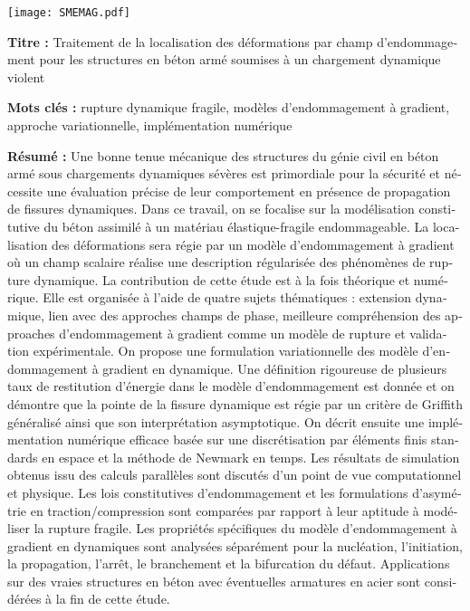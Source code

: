 \pagestyle{empty}

\begin{flushleft}
\texttt{[image: SMEMAG.pdf]}

\vspace{20pt}

\begin{mdframed}
\begin{otherlanguage}{french}
\textbf{Titre :} Traitement de la localisation des déformations par champ d'endommagement pour les structures en béton armé soumises à un chargement dynamique violent

\textbf{Mots clés :} rupture dynamique fragile, modèles d'endommagement à gradient, approche variationnelle, implémentation numérique

\textbf{Résumé :} Une bonne tenue mécanique des structures du génie civil en béton armé sous chargements dynamiques sévères est primordiale pour la sécurité et nécessite une évaluation précise de leur comportement en présence de propagation de fissures dynamiques. Dans ce travail, on se focalise sur la modélisation constitutive du béton assimilé à un matériau élastique-fragile endommageable. La localisation des déformations sera régie par un modèle d'endommagement à gradient où un champ scalaire réalise une description régularisée des phénomènes de rupture dynamique. La contribution de cette étude est à la fois théorique et numérique. Elle est organisée à l'aide de quatre sujets thématiques : extension dynamique, lien avec des approches champs de phase, meilleure compréhension des approaches d'endommagement à gradient comme un modèle de rupture et validation expérimentale. On propose une formulation variationnelle des modèle d'endommagement à gradient en dynamique. Une définition rigoureuse de plusieurs taux de restitution d'énergie dans le modèle d'endommagement est donnée et on démontre que la pointe de la fissure dynamique est régie par un critère de Griffith généralisé ainsi que son interprétation asymptotique. On décrit ensuite une implémentation numérique efficace basée sur une discrétisation par éléments finis standards en espace et la méthode de Newmark en temps. Les résultats de simulation obtenus issu des calculs parallèles sont discutés d'un point de vue computationnel et physique. Les lois constitutives d'endommagement et les formulations d'asymétrie en traction/compression sont comparées par rapport à leur aptitude à modéliser la rupture fragile. Les propriétés spécifiques du modèle d'endommagement à gradient en dynamiques sont analysées séparément pour la nucléation, l'initiation, la propagation, l'arrêt, le branchement et la bifurcation du défaut. Applications sur des vraies structures en béton avec  éventuelles armatures en acier sont considérées à la fin de cette étude.
\end{otherlanguage}
\end{mdframed}


\end{flushleft}
